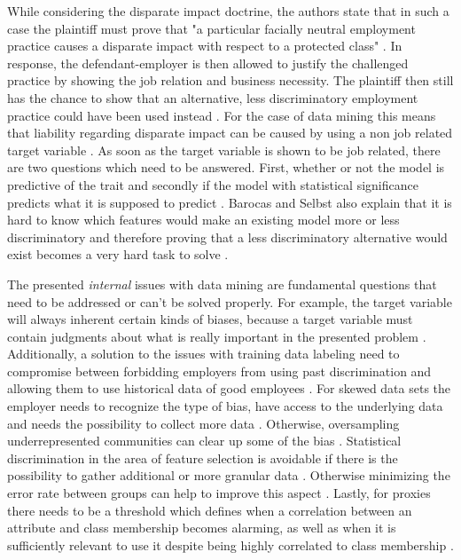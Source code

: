 While considering the disparate impact doctrine, the authors state that in such a case 
the plaintiff must prove that "a particular facially neutral employment practice causes 
a disparate impact with respect to a protected class" \cite{Barocas.2016, titleVII}. In response, the defendant-employer 
is then allowed to justify the challenged practice by showing the job relation and 
business necessity. The plaintiff then still has the chance 
to show that an alternative, less discriminatory employment practice could have been 
used instead \cite{Barocas.2016}. For the case of data mining this means that liability 
regarding disparate impact can be caused by using a non job related target variable 
\cite{Barocas.2016}. As soon as the target variable is shown to be job related, there 
are two questions which need to be answered. First, whether or not the model is 
predictive of the trait and secondly if the model with statistical significance 
predicts what it is supposed to predict \cite{Barocas.2016}. Barocas and Selbst 
also explain that it is hard to know which features would make an existing model more
or less discriminatory and therefore proving that a less discriminatory alternative 
would exist becomes a very hard task to solve \cite{Barocas.2016}.

The presented \textit{internal} issues with data mining are fundamental questions that need to be addressed or can't be solved properly. For example, the target variable will always inherent certain kinds of biases, because a target variable must contain judgments about what is really important in the presented problem \cite{Barocas.2016}. Additionally, a solution to the issues with training data labeling need to compromise between forbidding employers from using past discrimination and allowing them to use historical data of good employees \cite{Barocas.2016}. For skewed data sets the employer needs to recognize the type of bias, have access to the underlying data and needs the possibility to collect more data  \cite{Barocas.2016}. Otherwise, oversampling underrepresented communities can clear up some of the bias \cite{Barocas.2016}. Statistical discrimination in the area of feature selection is avoidable if there is the possibility to gather additional or more granular data \cite{Barocas.2016}. Otherwise minimizing the error rate between groups can help to improve this aspect \cite{Barocas.2016}. Lastly, for proxies there needs to be a threshold which defines when a correlation between an attribute and class membership becomes alarming, as well as when it is sufficiently relevant to use it despite being highly correlated to class membership \cite{Barocas.2016}.

